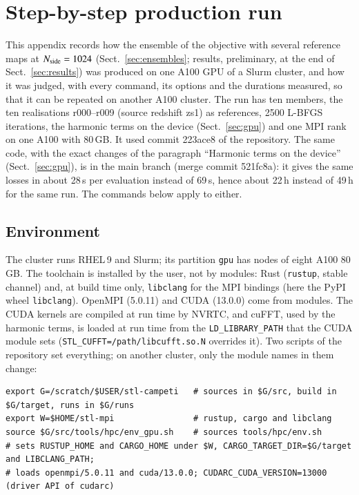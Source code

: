 \documentclass{aa}
\newcommand{\nside}{N_{\rm side}}
\begin{document}
\onecolumn
\section{Step-by-step production run}
\label{app:production}

This appendix records how the ensemble of the objective with several reference maps at $\nside=1024$ (Sect.~\ref{sec:ensembles}; results, preliminary, at the end of Sect.~\ref{sec:results}) was produced on one A100 GPU of a Slurm cluster, and how it was judged, with every command, its options and the durations measured, so that it can be repeated on another A100 cluster. The run has ten members, the ten \citet{takahashi2017} realisations r000--r009 (source redshift zs1) as references, 2500 L-BFGS iterations, the harmonic terms on the device (Sect.~\ref{sec:gpu}) and one MPI rank on one A100 with 80\,GB. It used commit 223ace8 of the repository. The same code, with the exact changes of the paragraph ``Harmonic terms on the device'' (Sect.~\ref{sec:gpu}), is in the main branch (merge commit 521fc8a): it gives the same losses in about 28\,s per evaluation instead of 69\,s, hence about 22\,h instead of 49\,h for the same run. The commands below apply to either.

\subsection{Environment}

The cluster runs RHEL\,9 and Slurm; its partition \texttt{gpu} has nodes of eight A100 80\,GB. The toolchain is installed by the user, not by modules: Rust (\texttt{rustup}, stable channel) and, at build time only, \texttt{libclang} for the MPI bindings (here the PyPI wheel \texttt{libclang}). OpenMPI (5.0.11) and CUDA (13.0.0) come from modules. The CUDA kernels are compiled at run time by NVRTC, and cuFFT, used by the harmonic terms, is loaded at run time from the \texttt{LD\_LIBRARY\_PATH} that the CUDA module sets (\texttt{STL\_CUFFT=/path/libcufft.so.N} overrides it). Two scripts of the repository set everything; on another cluster, only the module names in them change:
\begin{lstlisting}
export G=/scratch/$USER/stl-campeti   # sources in $G/src, build in $G/target, runs in $G/runs
export W=$HOME/stl-mpi                # rustup, cargo and libclang
source $G/src/tools/hpc/env_gpu.sh    # sources tools/hpc/env.sh
# sets RUSTUP_HOME and CARGO_HOME under $W, CARGO_TARGET_DIR=$G/target and LIBCLANG_PATH;
# loads openmpi/5.0.11 and cuda/13.0.0; CUDARC_CUDA_VERSION=13000 (driver API of cudarc)
\end{lstlisting}
\end{document}
